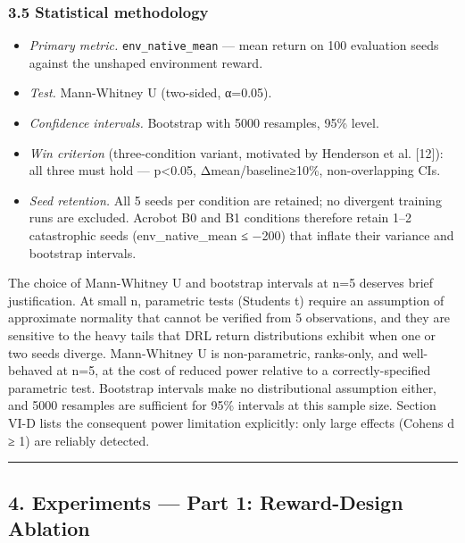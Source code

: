 \subsubsection{3.5 Statistical methodology}\label{35-statistical-methodology}

\begin{itemize}
\tightlist
\item
  \emph{Primary metric.} \texttt{env\_native\_mean} --- mean return on 100 evaluation seeds against the unshaped environment reward.
\item
  \emph{Test.} Mann-Whitney U (two-sided, α=0.05).
\item
  \emph{Confidence intervals.} Bootstrap with 5000 resamples, 95\% level.
\item
  \emph{Win criterion} (three-condition variant, motivated by Henderson et al. {[}12{]}): all three must hold --- p\textless0.05, \textbar Δmean\textbar/\textbar baseline\textbar≥10\%, non-overlapping CIs.
\item
  \emph{Seed retention.} All 5 seeds per condition are retained; no divergent training runs are excluded. Acrobot B0 and B1 conditions therefore retain 1--2 catastrophic seeds (env\_native\_mean ≤ −200) that inflate their variance and bootstrap intervals.
\end{itemize}

The choice of Mann-Whitney U and bootstrap intervals at n=5 deserves brief justification. At small n, parametric tests (Student\textquotesingle s t) require an assumption of approximate normality that cannot be verified from 5 observations, and they are sensitive to the heavy tails that DRL return distributions exhibit when one or two seeds diverge. Mann-Whitney U is non-parametric, ranks-only, and well-behaved at n=5, at the cost of reduced power relative to a correctly-specified parametric test. Bootstrap intervals make no distributional assumption either, and 5000 resamples are sufficient for 95\% intervals at this sample size. Section VI-D lists the consequent power limitation explicitly: only large effects (Cohen\textquotesingle s d ≥ 1) are reliably detected.

\begin{center}\rule{0.5\linewidth}{0.5pt}\end{center}

\subsection{4. Experiments --- Part 1: Reward-Design Ablation}\label{4-experiments--part-1-reward-design-ablation}

